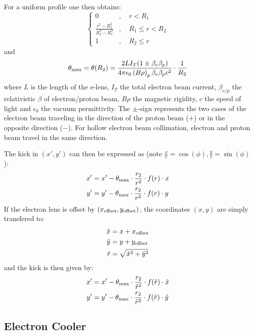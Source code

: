For a uniform profile one then obtains:
\begin{equation}
\begin{cases} 0 &,\quad r< R_1\\
\frac{r^2-R_1^2}{R_2^2-R_1^2} &,\quad R_1 \leq r < R_2\\
1 &,\quad R_2 \leq r
\end{cases}
\end{equation}
and
\begin{equation}
\theta_{\rm max} = \theta(R_2) = \frac{2LI_T(1\pm\beta_e\beta_p)}{4\pi\epsilon_0  \left(B\rho\right)_p\beta_e\beta_p c^2}\cdot\frac{1}{R_2}
\end{equation}
where $L$ is the length of the e-lens, $I_T$ the total electron beam current, $\beta_{e/p}$ the relativistic $\beta$ of electron/proton beam, $B\rho$ the magnetic rigidity, $c$ the speed of light and $\epsilon_0$ the vacuum permittivity. The $\pm$-sign represents the two cases of the electron beam traveling in the direction of the proton beam ($+$) or in the opposite direction ($-$). For hollow electron beam collimation, electron and proton beam travel in the same direction.

The kick in $(x',y')$ can then be expressed as (note $\frac{x}{r}=\cos(\phi),\frac{y}{r}=\sin(\phi)$):
\begin{align}
x'&=x'-\theta_{\rm max}\cdot\frac{r_2}{r^2}\cdot f(r)\cdot x\\
y'&=y'-\theta_{\rm max}\cdot\frac{r_2}{r^2}\cdot f(r)\cdot y
\end{align}
If the electron lens is offset by $(x_{\rm offset},y_{\rm offset})$, the coordinates $(x,y)$ are simply transfered to:
\begin{align}
\tilde x&=x+x_{\rm offset}\\
\tilde y&=y+y_{\rm offset}\\
\tilde r&=\sqrt{\tilde x^2+\tilde y^2}
\end{align}
and the kick is then given by:
\begin{align}
x'&=x'-\theta_{\rm max}\cdot\frac{r_2}{\tilde r^2}\cdot f(\tilde r)\cdot \tilde x\\
y'&=y'-\theta_{\rm max}\cdot\frac{r_2}{\tilde r^2}\cdot f(\tilde r)\cdot \tilde y
\end{align}

\subsection{Electron Cooler}

